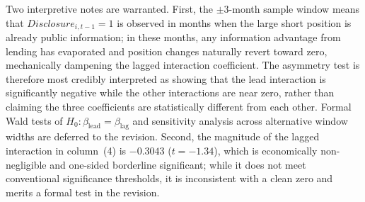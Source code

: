 Two interpretive notes are warranted. First, the $\pm 3$-month sample window means that $\mathit{Disclosure}_{i,t-1} = 1$ is observed in months when the large short position is already public information; in these months, any information advantage from lending has evaporated and position changes naturally revert toward zero, mechanically dampening the lagged interaction coefficient. The asymmetry test is therefore most credibly interpreted as showing that the lead interaction is significantly negative while the other interactions are near zero, rather than claiming the three coefficients are statistically different from each other. Formal Wald tests of $H_0\colon \beta_{\text{lead}} = \beta_{\text{lag}}$ and sensitivity analysis across alternative window widths are deferred to the revision. Second, the magnitude of the lagged interaction in column~(4) is $-0.3043$ ($t = -1.34$), which is economically non-negligible and one-sided borderline significant; while it does not meet conventional significance thresholds, it is inconsistent with a clean zero and merits a formal test in the revision.
